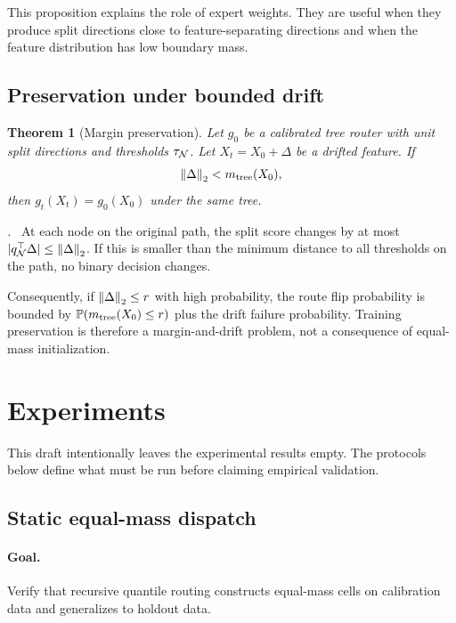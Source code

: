 \documentclass{article}
\newtheorem{theorem}{Theorem}
\renewenvironment{proof}[1][\proofname]{\par\noindent\textit{#1.}\ }{\hfill\qedsymbol\par}
\begin{document}
This proposition explains the role of expert weights.  They are useful when they
produce split directions close to feature-separating directions and when the
feature distribution has low boundary mass.

\subsection{Preservation under bounded drift}

\begin{theorem}[Margin preservation]
Let $g_0$ be a calibrated tree router with unit split directions and thresholds
$\tau_{\mathcal{N}}$.  Let $X_t=X_0+\Delta$ be a drifted feature.  If
\begin{equation}
  \left\lVert \Delta \right\rVert_2 < m_{\mathrm{tree}}(X_0),
\end{equation}
then $g_t(X_t)=g_0(X_0)$ under the same tree.
\end{theorem}

\begin{proof}
At each node on the original path, the split score changes by at most
$|q_{\mathcal{N}}^{\top}\Delta|\le\left\lVert \Delta \right\rVert_2$.  If this is smaller than the
minimum distance to all thresholds on the path, no binary decision changes.
\end{proof}

Consequently, if $\left\lVert \Delta \right\rVert_2\le r$ with high probability, the route flip
probability is bounded by $\mathbb{P}(m_{\mathrm{tree}}(X_0)\le r)$ plus the drift
failure probability.  Training preservation is therefore a margin-and-drift
problem, not a consequence of equal-mass initialization.

\section{Experiments}
\label{sec:experiments}

This draft intentionally leaves the experimental results empty.  The protocols
below define what must be run before claiming empirical validation.

\subsection{Static equal-mass dispatch}

\paragraph{Goal.} Verify that recursive quantile routing constructs equal-mass
cells on calibration data and generalizes to holdout data.
\end{document}
